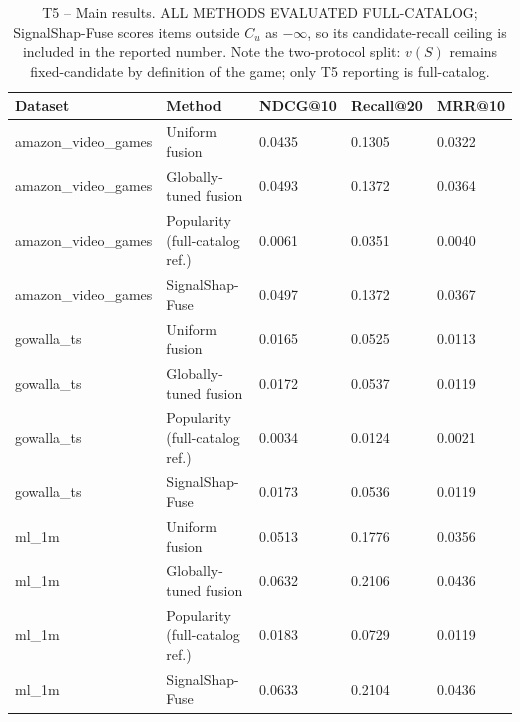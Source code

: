 \begin{table}[htbp]
\centering
\footnotesize
\caption{T5 -- Main results. ALL METHODS EVALUATED FULL-CATALOG; SignalShap-Fuse scores items outside $C_u$ as $-\infty$, so its candidate-recall ceiling is included in the reported number. Note the two-protocol split: $v(S)$ remains fixed-candidate by definition of the game; only T5 reporting is full-catalog.}
\label{tab:T5_main_results}
\begin{tabular}{lllll}
\toprule
Dataset & Method & NDCG@10 & Recall@20 & MRR@10 \\
\midrule
amazon\_video\_games & Uniform fusion & 0.0435 & 0.1305 & 0.0322 \\
amazon\_video\_games & Globally-tuned fusion & 0.0493 & 0.1372 & 0.0364 \\
amazon\_video\_games & Popularity (full-catalog ref.) & 0.0061 & 0.0351 & 0.0040 \\
amazon\_video\_games & SignalShap-Fuse & 0.0497 & 0.1372 & 0.0367 \\
gowalla\_ts & Uniform fusion & 0.0165 & 0.0525 & 0.0113 \\
gowalla\_ts & Globally-tuned fusion & 0.0172 & 0.0537 & 0.0119 \\
gowalla\_ts & Popularity (full-catalog ref.) & 0.0034 & 0.0124 & 0.0021 \\
gowalla\_ts & SignalShap-Fuse & 0.0173 & 0.0536 & 0.0119 \\
ml\_1m & Uniform fusion & 0.0513 & 0.1776 & 0.0356 \\
ml\_1m & Globally-tuned fusion & 0.0632 & 0.2106 & 0.0436 \\
ml\_1m & Popularity (full-catalog ref.) & 0.0183 & 0.0729 & 0.0119 \\
ml\_1m & SignalShap-Fuse & 0.0633 & 0.2104 & 0.0436 \\
\bottomrule
\end{tabular}
\end{table}
